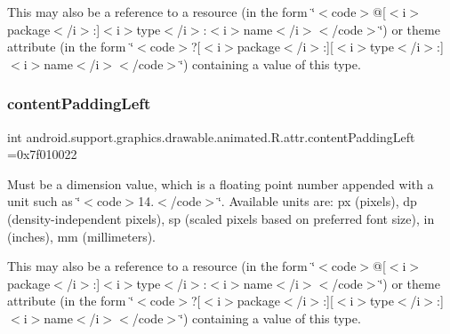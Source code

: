 This may also be a reference to a resource (in the form \char`\"{}$<$code$>$@\mbox{[}$<$i$>$package$<$/i$>$\+:\mbox{]}$<$i$>$type$<$/i$>$\+:$<$i$>$name$<$/i$>$$<$/code$>$\char`\"{}) or theme attribute (in the form \char`\"{}$<$code$>$?\mbox{[}$<$i$>$package$<$/i$>$\+:\mbox{]}\mbox{[}$<$i$>$type$<$/i$>$\+:\mbox{]}$<$i$>$name$<$/i$>$$<$/code$>$\char`\"{}) containing a value of this type. \mbox{\label{classandroid_1_1support_1_1graphics_1_1drawable_1_1animated_1_1R_1_1attr_ac9caa8d2e0cb8b7819f5db0b824bc644}} 
\subsubsection{\texorpdfstring{content\+Padding\+Left}{contentPaddingLeft}}
{\footnotesize\ttfamily int android.\+support.\+graphics.\+drawable.\+animated.\+R.\+attr.\+content\+Padding\+Left =0x7f010022\hspace{0.3cm}{\ttfamily [static]}}

Must be a dimension value, which is a floating point number appended with a unit such as \char`\"{}$<$code$>$14.\+5sp$<$/code$>$\char`\"{}. Available units are\+: px (pixels), dp (density-\/independent pixels), sp (scaled pixels based on preferred font size), in (inches), mm (millimeters). 

This may also be a reference to a resource (in the form \char`\"{}$<$code$>$@\mbox{[}$<$i$>$package$<$/i$>$\+:\mbox{]}$<$i$>$type$<$/i$>$\+:$<$i$>$name$<$/i$>$$<$/code$>$\char`\"{}) or theme attribute (in the form \char`\"{}$<$code$>$?\mbox{[}$<$i$>$package$<$/i$>$\+:\mbox{]}\mbox{[}$<$i$>$type$<$/i$>$\+:\mbox{]}$<$i$>$name$<$/i$>$$<$/code$>$\char`\"{}) containing a value of this type. \mbox{\label{classandroid_1_1support_1_1graphics_1_1drawable_1_1animated_1_1R_1_1attr_a246f194a5f46a0c26ffae90d60faeca9}} 
